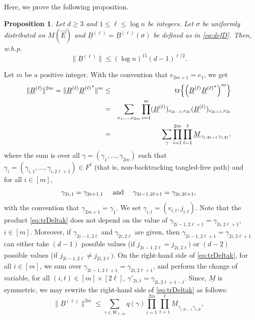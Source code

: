 \documentclass[11pt]{article}
\newtheorem{proposition}[lemma]{Proposition}
\newcommand{\tr}{{\rm tr}}
\newcommand{\BRA}[1]{{{\left\{#1\right\}}}}
\newcommand{\PAR}[1]{{{\left(#1\right)}}} %
\newcommand{\uB}{{\underline B}}
\newcommand{\1}{1\!\!{\sf I}}\newcommand{\IND}{\1}
\newcommand{\whp}{{w.h.p.~}}
\begin{document}
Here, we prove the following proposition. 

\begin{proposition} \label{prop:normDelta}
Let $d \geq 3$ and $1 \leq \ell \leq  \log n$ be integers.  Let $\sigma$ be uniformly distributed on $M(\vec E)$ and $\uB^{(\ell)} = \uB^{(\ell)}(\sigma)$ be defined as in \eqref{eq:defD}. Then, \whp
$$ \| \uB^{(\ell)} \| \leq ( \log n) ^{15} \PAR{ d -1} ^{\ell /2}.$$
\end{proposition}
Let $m$ be a positive integer. With the convention that $e_{2m + 1} = e_1$, we get 
\begin{eqnarray}
\|\uB^{(\ell)}  \| ^{2 m} = \|\uB^{(\ell)}{\uB^{(\ell)}}^*  \| ^{m} & \leq & \tr \BRA{ \PAR{  \uB^{(\ell)}{\uB^{(\ell)}}^*}^{m}  } \nonumber\\
& = & \sum_{e_1, \ldots, e_{2m}}\prod_{i=1}^{m}  (\uB^{(\ell)}) _{e_{2i-1} , e_{2 i}}(\uB^{(\ell)}) _{e_{2i+1} , e_{2 i}} \nonumber \\
& =  &  \sum_{\gamma }   \prod_{i=1}^{2m}  \prod_{t=1}^{\ell} \underline M_{\gamma_{i,2t-1}  \gamma_{i,2t}} ,  \label{eq:trDeltak}
\end{eqnarray}
where the sum is over all  $\gamma = ( \gamma_1, \ldots, \gamma_{2m})$ such that $\gamma_i = (\gamma_{i,1}, \ldots, \gamma_{i,2\ell+1}) \in F^{\ell}$ (that is, non-backtracking tangled-free path) and for all $i  \in [m]$, 
$$
\gamma_{2i,1} = \gamma_{2i+1, 1} \quad \hbox{ and } \quad  \gamma_{2i-1,2\ell+1} = \gamma_{2i, 2\ell+1},
$$
with the convention that $\gamma_{2m+1} = \gamma_{1}$. We set $\gamma_{i,t} = (v_{i,t}, j_{i,t})$. Note that the product \eqref{eq:trDeltak} does not depend on the value of $\gamma_{2i-1,2\ell+1} = \gamma_{2i, 2\ell+1}$, $i\in [ m]$. Moreover, if $\gamma_{2i-1,2\ell}$ and $\gamma_{2i,2\ell}$ are given, then $\gamma_{2i-1,2\ell+1} = \gamma_{2i, 2\ell+1}$ can either take $(d-1)$ possible values (if $j_{2i-1,2\ell} = j_{2i,2\ell})$ or $(d-2)$ possible values (if $j_{2i-1,2\ell} \ne j_{2i,2\ell})$. On the right-hand side of \eqref{eq:trDeltak}, for all $i \in [m]$, we sum over $\gamma_{2i-1,2\ell+1} = \gamma_{2i, 2\ell+1}$, and perform the change of variable, for all $(i,t) \in [m] \times  [2\ell]$, $\gamma'_{2i,t} = \gamma_{2i, 2 \ell +1 -t }$. Since, $\underline M$ is symmetric, we may rewrite the right-hand side of \eqref{eq:trDeltak} as follows: 
\begin{equation}\label{eq:trDeltak2}
\| \uB^{(\ell)}  \| ^{2 m}  \leq   \sum_{\gamma \in W_{\ell,m}}  q(\gamma)  \prod_{i=1}^{2m}  \prod_{t=1}^{\ell} \underline M_{\gamma_{i,2t-1}  \gamma_{i,2t}} , 
\end{equation}
\end{document}
